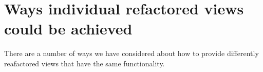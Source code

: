 % 
% 
% 


\section{Ways individual refactored views could be achieved}
There are a number of ways we have considered about how to provide differently reafactored views that have the same functionality.

